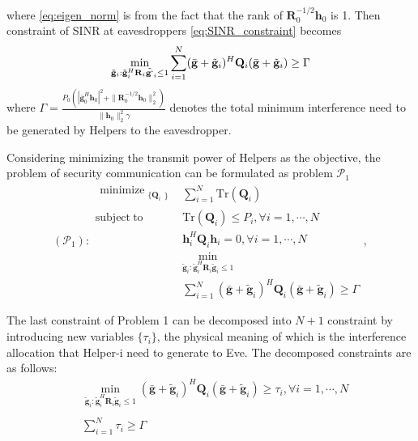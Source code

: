 \documentclass[conference]{IEEEtran}
\begin{document}
where \eqref{eq:eigen_norm} is from the fact that the rank of $\mathbf{R}_0^{-1/2}\mathbf{h}_0$ is 1. Then constraint of SINR at eavesdroppers \eqref{eq:SINR_constraint} becomes
\begin{eqnarray}
\min_{\tilde{\mathbf{g}}_i: \tilde{\mathbf{g}}_i^H \mathbf{R}_i\tilde{\mathbf{g`}}_i \leq 1}\sum_{i=1}^{N}(\bar{\mathbf{g}}+\tilde{\mathbf{g}}_i)^H\mathbf{Q}_i(\bar{\mathbf{g}}+\tilde{\mathbf{g}}_i) \geq \Gamma  \label{eq:artificial noise constraint}
\end{eqnarray}
where $\Gamma =\frac{P_0\left(|\bar{\mathbf{g}}_0^H\mathbf{h}_0|^2 + \|\mathbf{R}_0^{-1/2}\mathbf{h}_0\|_2^2\right)}{\|\mathbf{h}_0\|_2^2\gamma}$ denotes the total minimum interference need to be generated by Helpers to the eavesdropper.

Considering minimizing the transmit power of Helpers as the objective, the problem of security communication can be formulated as problem $\mathcal{P}_1$ 
\begin{equation}\label{eq:problem1}
(\mathcal{P}_{1}): \begin{array}{ll}
\begin{split}
\mathop{\text{minimize}}_{\substack{\{\mathbf{Q}_{i}}\}} 
\end{split}  
& \sum_{i = 1}^{N}\mathrm{Tr}(\mathbf{Q}_i)\\
\mathrm{subject~to} &\mathrm{Tr}(\mathbf{Q}_i) \leq P_i, \forall i = 1, \cdots, N\\
& \mathbf{h}_i^H \mathbf{Q}_i \mathbf{h}_i= 0, \forall i = 1,\cdots,N\\
&\min_{\tilde{\mathbf{g}}_i: \tilde{\mathbf{g}}_i^H \mathbf{R}_i\tilde{\mathbf{g}}_i \leq 1}\\
&\sum_{i=1}^{N}(\bar{\mathbf{g}}+\tilde{\mathbf{g}}_i)^H\mathbf{Q}_i(\bar{\mathbf{g}}+\tilde{\mathbf{g}}_i) \geq  \Gamma
\end{array},
\end{equation}

The last constraint of Problem 1 can be decomposed into $N+1$ constraint by introducing new variables $\{\tau_i\}$, the physical meaning of which is the interference allocation that Helper-i need to generate to Eve. The decomposed constraints are as follows:
\begin{eqnarray}
&\min_{\tilde{\mathbf{g}}_i: \tilde{\mathbf{g}}_i^H \mathbf{R}_i\tilde{\mathbf{g}}_i \leq 1}(\bar{\mathbf{g}}+\tilde{\mathbf{g}}_i)^H\mathbf{Q}_i(\bar{\mathbf{g}}+\tilde{\mathbf{g}}_i) \geq  \tau_i, \forall i = 1,\cdots,N\label{eq:artificial noise constraint decomposed} \nonumber\\
\\
&\sum_{i =1}^{N}\tau_i \geq \Gamma
\end{eqnarray}
\end{document}
